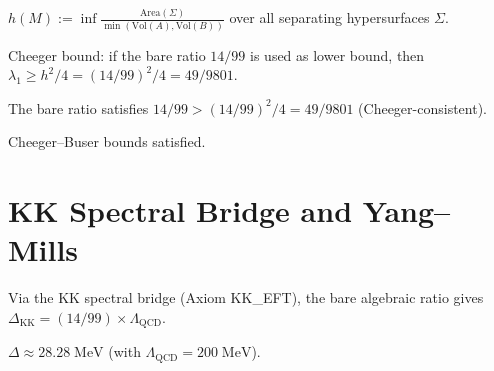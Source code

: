 \begin{definition}\label{def:cheeger}
    \leanok
    $h(M) := \inf \frac{\mathrm{Area}(\Sigma)}{\min(\mathrm{Vol}(A), \mathrm{Vol}(B))}$
    over all separating hypersurfaces $\Sigma$.
\end{definition}

\begin{theorem}\label{thm:K7_cheeger}
    \leanok
    Cheeger bound: if the bare ratio $14/99$ is used as lower bound,
    then $\lambda_1 \geq h^2/4 = (14/99)^2/4 = 49/9801$.
\end{theorem}

\begin{theorem}\label{thm:gap_exceeds_cheeger}
    \leanok
    The bare ratio satisfies $14/99 > (14/99)^2/4 = 49/9801$ (Cheeger-consistent).
\end{theorem}

\begin{theorem}\label{thm:cheeger_cert}
    \leanok
    Cheeger--Buser bounds satisfied.
\end{theorem}

\section{KK Spectral Bridge and Yang--Mills}

\begin{theorem}\label{thm:ym_prediction}
    \leanok
    Via the KK spectral bridge (Axiom KK\_EFT), the bare algebraic ratio gives
    $\Delta_{\mathrm{KK}} = (14/99) \times \Lambda_{\mathrm{QCD}}$.
\end{theorem}

\begin{theorem}\label{thm:ym_MeV}
    \leanok
    $\Delta \approx 28.28\; \mathrm{MeV}$ (with $\Lambda_{\mathrm{QCD}} = 200\; \mathrm{MeV}$).
\end{theorem}

